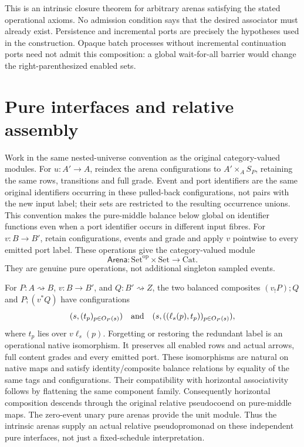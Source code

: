 \documentclass[11pt]{article}
\begin{document}
This is an intrinsic closure theorem for arbitrary arenas satisfying the stated operational axioms. No admission condition says that the desired associator must already exist. Persistence and incremental ports are precisely the hypotheses used in the construction. Opaque batch processes without incremental continuation ports need not admit this composition: a global wait-for-all barrier would change the right-parenthesized enabled sets.

\section{Pure interfaces and relative assembly}
Work in the same nested-universe convention as the original category-valued modules. For $u:A'\to A$, reindex the arena configurations to $A'\times_A S_P$, retaining the same rows, transitions and full grade. Event and port identifiers are the same original identifiers occurring in these pulled-back configurations, not pairs with the new input label; their sets are restricted to the resulting occurrence unions. This convention makes the pure-middle balance below global on identifier functions even when a port identifier occurs in different input fibres. For $v:B\to B'$, retain configurations, events and grade and apply $v$ pointwise to every emitted port label. These operations give the category-valued module
\[
 \mathsf{Arena}:\mathrm{Set}^{\mathrm{op}}\times\mathrm{Set}\longrightarrow\mathrm{Cat}.
\]
They are genuine pure operations, not additional singleton sampled events.

For $P:A\rightsquigarrow B$, $v:B\to B'$, and $Q:B'\rightsquigarrow Z$, the two balanced composites $(v_!P);Q$ and $P;(v^*Q)$ have configurations
\[
 (s,(t_p)_{p\in O_P(s)})\quad\hbox{and}\quad
 (s,((\ell_s(p),t_p))_{p\in O_P(s)}),
\]
where $t_p$ lies over $v\ell_s(p)$. Forgetting or restoring the redundant label is an operational native isomorphism. It preserves all enabled rows and actual arrows, full content grades and every emitted port. These isomorphisms are natural on native maps and satisfy identity/composite balance relations by equality of the same tags and configurations. Their compatibility with horizontal associativity follows by flattening the same component family. Consequently horizontal composition descends through the original relative pseudocoend on pure-middle maps. The zero-event unary pure arenas provide the unit module. Thus the intrinsic arenas supply an actual relative pseudopromonad on these independent pure interfaces, not just a fixed-schedule interpretation.
\end{document}
